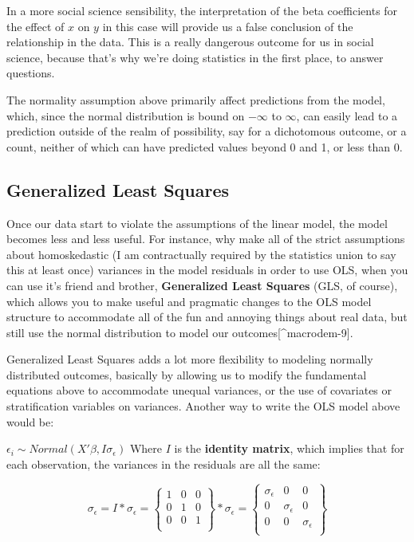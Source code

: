 \documentclass[
  letterpaper,
  DIV=11,
  numbers=noendperiod]{scrreprt}
\begin{document}
In a more social science sensibility, the interpretation of the beta
coefficients for the effect of \(x\) on \(y\) in this case will provide
us a false conclusion of the relationship in the data. This is a really
dangerous outcome for us in social science, because that's why we're
doing statistics in the first place, to answer questions.

The normality assumption above primarily affect predictions from the
model, which, since the normal distribution is bound on \(-\infty\) to
\(\infty\), can easily lead to a prediction outside of the realm of
possibility, say for a dichotomous outcome, or a count, neither of which
can have predicted values beyond 0 and 1, or less than 0.

\hypertarget{generalized-least-squares}{%
\subsection{Generalized Least Squares}\label{generalized-least-squares}}

Once our data start to violate the assumptions of the linear model, the
model becomes less and less useful. For instance, why make all of the
strict assumptions about homoskedastic (I am contractually required by
the statistics union to say this at least once) variances in the model
residuals in order to use OLS, when you can use it's friend and brother,
\textbf{Generalized Least Squares} (GLS, of course), which allows you to
make useful and pragmatic changes to the OLS model structure to
accommodate all of the fun and annoying things about real data, but
still use the normal distribution to model our
outcomes{[}\^{}macrodem-9{]}.

Generalized Least Squares adds a lot more flexibility to modeling
normally distributed outcomes, basically by allowing us to modify the
fundamental equations above to accommodate unequal variances, or the use
of covariates or stratification variables on variances. Another way to
write the OLS model above would be:

\(\epsilon_i \sim Normal(X'\beta, I\sigma_\epsilon)\) Where \(I\) is the
\textbf{identity matrix}, which implies that for each observation, the
variances in the residuals are all the same:

\[
\sigma_{\epsilon}  = I * \sigma_{\epsilon} = \begin{Bmatrix}
1& 0& 0 \\
0& 1& 0 \\
0& 0& 1\\
\end{Bmatrix} *\sigma_{\epsilon} = \begin{Bmatrix}
\sigma_{\epsilon}& 0& 0 \\
0& \sigma_{\epsilon}& 0 \\
0& 0 & \sigma_{\epsilon} \\
\end{Bmatrix}
\]
\end{document}
